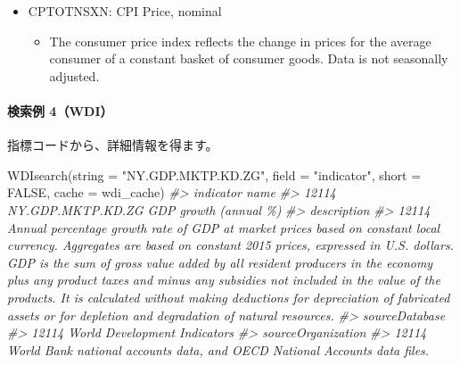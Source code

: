 \documentclass[
]{bxjsbook}
\newenvironment{Shaded}{\begin{snugshade}}{\end{snugshade}}
\newcommand{\AttributeTok}[1]{\textcolor[rgb]{0.77,0.63,0.00}{#1}}
\newcommand{\CommentTok}[1]{\textcolor[rgb]{0.56,0.35,0.01}{\textit{#1}}}
\newcommand{\ConstantTok}[1]{\textcolor[rgb]{0.00,0.00,0.00}{#1}}
\newcommand{\FunctionTok}[1]{\textcolor[rgb]{0.00,0.00,0.00}{#1}}
\newcommand{\NormalTok}[1]{#1}
\newcommand{\StringTok}[1]{\textcolor[rgb]{0.31,0.60,0.02}{#1}}
\providecommand{\tightlist}{%
  \setlength{\itemsep}{0pt}\setlength{\parskip}{0pt}}
\theoremstyle{definition}
\theoremstyle{definition}
\theoremstyle{definition}
\theoremstyle{definition}
\theoremstyle{remark}
\begin{document}
\begin{itemize}
\tightlist
\item
  CPTOTNSXN: CPI Price, nominal

  \begin{itemize}
  \tightlist
  \item
    The consumer price index reflects the change in prices for the average consumer of a constant basket of consumer goods. Data is not seasonally adjusted.
  \end{itemize}
\end{itemize}

\hypertarget{ux691cux7d22ux4f8b-4wdi}{%
\paragraph{検索例 4（WDI）}\label{ux691cux7d22ux4f8b-4wdi}}

指標コードから、詳細情報を得ます。

\begin{Shaded}
\begin{Highlighting}[]
\FunctionTok{WDIsearch}\NormalTok{(}\AttributeTok{string =} \StringTok{"NY.GDP.MKTP.KD.ZG"}\NormalTok{, }\AttributeTok{field =} \StringTok{"indicator"}\NormalTok{, }\AttributeTok{short =} \ConstantTok{FALSE}\NormalTok{, }\AttributeTok{cache =}\NormalTok{ wdi\_cache)}
\CommentTok{\#\textgreater{}               indicator                  name}
\CommentTok{\#\textgreater{} 12114 NY.GDP.MKTP.KD.ZG GDP growth (annual \%)}
\CommentTok{\#\textgreater{}                                                                                                                                                                                                                                                                                                                                                                                                                                                                           description}
\CommentTok{\#\textgreater{} 12114 Annual percentage growth rate of GDP at market prices based on constant local currency. Aggregates are based on constant 2015 prices, expressed in U.S. dollars. GDP is the sum of gross value added by all resident producers in the economy plus any product taxes and minus any subsidies not included in the value of the products. It is calculated without making deductions for depreciation of fabricated assets or for depletion and degradation of natural resources.}
\CommentTok{\#\textgreater{}                     sourceDatabase}
\CommentTok{\#\textgreater{} 12114 World Development Indicators}
\CommentTok{\#\textgreater{}                                                              sourceOrganization}
\CommentTok{\#\textgreater{} 12114 World Bank national accounts data, and OECD National Accounts data files.}
\end{Highlighting}
\end{Shaded}
\end{document}

